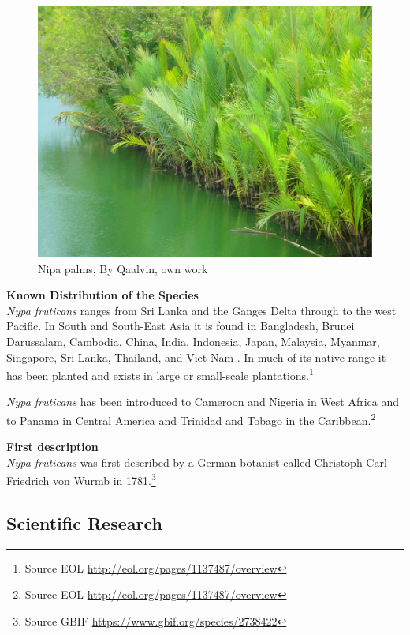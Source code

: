 \documentclass[]{book}
\let\rmarkdownfootnote\footnote%
\def\footnote{\protect\rmarkdownfootnote}
\theoremstyle{definition}
\theoremstyle{definition}
\theoremstyle{definition}
\theoremstyle{remark}
\begin{document}
\begin{figure}

{\centering \includegraphics[width=13.33in]{images_species/Nipa_palms} 

}

\caption{Nipa palms, By Qaalvin, own work}\label{fig:unnamed-chunk-6}
\end{figure}

\textbf{Known Distribution of the Species}\\
\emph{Nypa fruticans} ranges from Sri Lanka and the Ganges Delta through
to the west Pacific. In South and South-East Asia it is found in
Bangladesh, Brunei Darussalam, Cambodia, China, India, Indonesia, Japan,
Malaysia, Myanmar, Singapore, Sri Lanka, Thailand, and Viet Nam . In
much of its native range it has been planted and exists in large or
small-scale plantations.\footnote{Source EOL
  \url{http://eol.org/pages/1137487/overview}}

\emph{Nypa fruticans} has been introduced to Cameroon and Nigeria in
West Africa and to Panama in Central America and Trinidad and Tobago in
the Caribbean.\footnote{Source EOL
  \url{http://eol.org/pages/1137487/overview}}

\textbf{First description}\\
\emph{Nypa fruticans} was first described by a German botanist called
Christoph Carl Friedrich von Wurmb in 1781.\footnote{Source GBIF
  \url{https://www.gbif.org/species/2738422}}

\hypertarget{scientific-research-4}{%
\subsection{Scientific Research}\label{scientific-research-4}}
\end{document}
